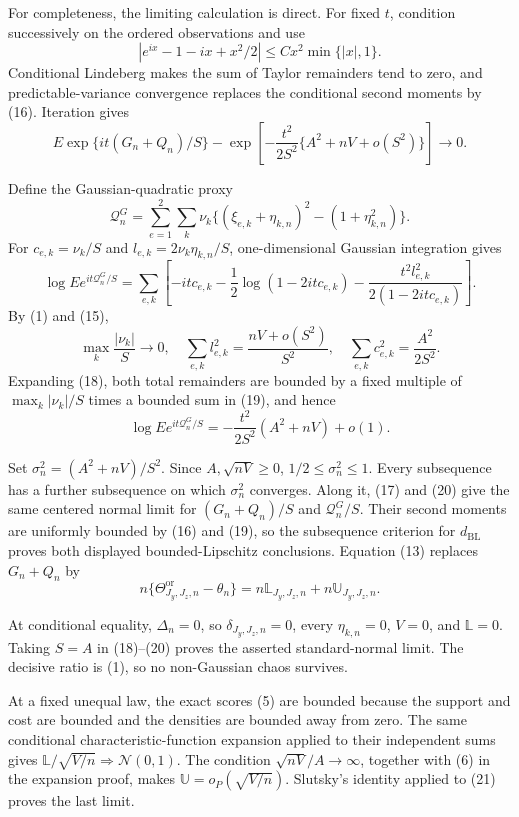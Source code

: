 For completeness, the limiting calculation is direct. For fixed \(t\), condition successively on the ordered observations and use
\[
|e^{ix}-1-ix+x^2/2|\le Cx^2\min\{|x|,1\}.
\]
Conditional Lindeberg makes the sum of Taylor remainders tend to zero, and predictable-variance convergence replaces the conditional second moments by (16). Iteration gives
\[
E\exp\{it(G_n+Q_n)/S\}
-\exp\!\left[-\frac{t^2}{2S^2}\{A^2+nV+o(S^2)\}\right]\to0. \tag{17}
\]

Define the Gaussian-quadratic proxy
\[
\mathcal Q_n^G=\sum_{e=1}^2\sum_k\nu_k
\{(\xi_{e,k}+\eta_{k,n})^2-(1+\eta_{k,n}^2)\}.
\]
For \(c_{e,k}=\nu_k/S\) and \(l_{e,k}=2\nu_k\eta_{k,n}/S\), one-dimensional Gaussian integration gives
\[
\log Ee^{it\mathcal Q_n^G/S}
=\sum_{e,k}\left[-itc_{e,k}-\frac12\log(1-2itc_{e,k})
-\frac{t^2l_{e,k}^2}{2(1-2itc_{e,k})}\right].                  \tag{18}
\]
By (1) and (15),
\[
\max_k\frac{|\nu_k|}{S}\to0,
\quad
\sum_{e,k}l_{e,k}^2=\frac{nV+o(S^2)}{S^2},
\quad
\sum_{e,k}c_{e,k}^2=\frac{A^2}{2S^2}.                           \tag{19}
\]
Expanding (18), both total remainders are bounded by a fixed multiple of \(\max_k|\nu_k|/S\) times a bounded sum in (19), and hence
\[
\log Ee^{it\mathcal Q_n^G/S}
=-\frac{t^2}{2S^2}(A^2+nV)+o(1).                                \tag{20}
\]

Set \(\sigma_n^2=(A^2+nV)/S^2\). Since \(A,\sqrt{nV}\ge0\), \(1/2\le\sigma_n^2\le1\). Every subsequence has a further subsequence on which \(\sigma_n^2\) converges. Along it, (17) and (20) give the same centered normal limit for \((G_n+Q_n)/S\) and \(\mathcal Q_n^G/S\). Their second moments are uniformly bounded by (16) and (19), so the subsequence criterion for \(d_{\mathrm{BL}}\) proves both displayed bounded-Lipschitz conclusions. Equation (13) replaces \(G_n+Q_n\) by
\[
n\{\Theta^{\mathrm{or}}_{J_y,J_z,n}-\theta_n\}
=n\mathbb L_{J_y,J_z,n}+n\mathbb U_{J_y,J_z,n}.                \tag{21}
\]

At conditional equality, \(\Delta_n=0\), so \(\delta_{J_y,J_z,n}=0\), every \(\eta_{k,n}=0\), \(V=0\), and \(\mathbb L=0\). Taking \(S=A\) in (18)--(20) proves the asserted standard-normal limit. The decisive ratio is (1), so no non-Gaussian chaos survives.

At a fixed unequal law, the exact scores (5) are bounded because the support and cost are bounded and the densities are bounded away from zero. The same conditional characteristic-function expansion applied to their independent sums gives \(\mathbb L/\sqrt{V/n}\Rightarrow\mathcal N(0,1)\). The condition \(\sqrt{nV}/A\to\infty\), together with (6) in the expansion proof, makes \(\mathbb U=o_P(\sqrt{V/n})\). Slutsky's identity applied to (21) proves the last limit.